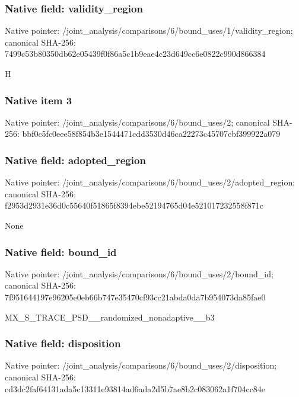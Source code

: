 \documentclass[10pt,a4paper]{article}
\begin{document}
\subsubsection{Native field: validity\_\allowbreak{}region}
Native pointer: /joint\_\allowbreak{}analysis/comparisons/6/bound\_\allowbreak{}uses/1/validity\_\allowbreak{}region; canonical SHA-256: 7499c53b80350db62e05439f0f86a5c1b9eae4c23d649cc6e0822c990d866384

\begingroup\raggedright\sloppy H\par\endgroup

\subsubsection{Native item 3}
Native pointer: /joint\_\allowbreak{}analysis/comparisons/6/bound\_\allowbreak{}uses/2; canonical SHA-256: bbf0c5fc0eee58f854b3e1544471cdd3530d46ca22273c45707cbf399922a079

\subsubsection{Native field: adopted\_\allowbreak{}region}
Native pointer: /joint\_\allowbreak{}analysis/comparisons/6/bound\_\allowbreak{}uses/2/adopted\_\allowbreak{}region; canonical SHA-256: f2953d2931e36d0c55640f51865f8394ebe52194765d04e521017232558f871c

\begingroup\raggedright\sloppy None\par\endgroup

\subsubsection{Native field: bound\_\allowbreak{}id}
Native pointer: /joint\_\allowbreak{}analysis/comparisons/6/bound\_\allowbreak{}uses/2/bound\_\allowbreak{}id; canonical SHA-256: 7f951644197e96205e0eb66b747e35470cf93cc21abda0da7b954073da85fae0

\begingroup\raggedright\sloppy MX\_\allowbreak{}S\_\allowbreak{}TRACE\_\allowbreak{}PSD\_\allowbreak{}\_\allowbreak{}randomized\_\allowbreak{}nonadaptive\_\allowbreak{}\_\allowbreak{}b3\par\endgroup

\subsubsection{Native field: disposition}
Native pointer: /joint\_\allowbreak{}analysis/comparisons/6/bound\_\allowbreak{}uses/2/disposition; canonical SHA-256: cd3dc2faf64131ada5c13311e93814ad6ada2d5b7ae8b2c083062a1f704cc84e
\end{document}

